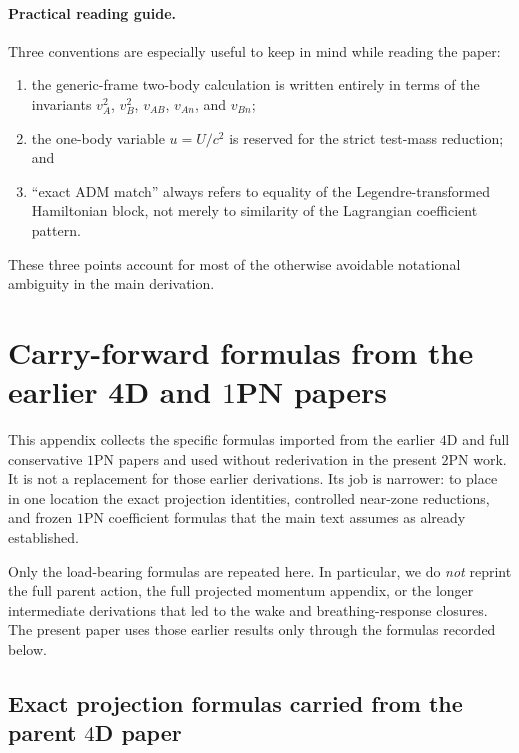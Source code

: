 \documentclass[11pt]{article}
\newcommand{\OnePN}{\mathrm{1PN}}
\newcommand{\TwoPN}{\mathrm{2PN}}
\newcommand{\ADM}{\mathrm{ADM}}
\begin{document}
\paragraph{Practical reading guide.}
Three conventions are especially useful to keep in mind while reading the paper:
\begin{enumerate}[leftmargin=1.5em]
  \item the generic-frame two-body calculation is written entirely in terms of the
  invariants \(v_A^2\), \(v_B^2\), \(v_{AB}\), \(v_{An}\), and \(v_{Bn}\);
  \item the one-body variable \(u=U/c^2\) is reserved for the strict test-mass reduction;
  and
  \item “exact \(\ADM\) match” always refers to equality of the Legendre-transformed
  Hamiltonian block, not merely to similarity of the Lagrangian coefficient pattern.
\end{enumerate}
These three points account for most of the otherwise avoidable notational ambiguity in the
main derivation.

\section{Carry-forward formulas from the earlier 4D and \texorpdfstring{$1$}{1}PN papers}
\label{app:carry-forward-formulas}

This appendix collects the specific formulas imported from the earlier \(4\)D and
full conservative \(\OnePN\) papers and used without rederivation in the present
\(\TwoPN\) work.  It is not a replacement for those earlier derivations.  Its job is
narrower: to place in one location the exact projection identities, controlled
near-zone reductions, and frozen \(\OnePN\) coefficient formulas that the main text
assumes as already established.

Only the load-bearing formulas are repeated here.  In particular, we do \emph{not}
reprint the full parent action, the full projected momentum appendix, or the longer
intermediate derivations that led to the wake and breathing-response closures.  The
present paper uses those earlier results only through the formulas recorded below.

\subsection{Exact projection formulas carried from the parent \texorpdfstring{$4$}{4}D paper}
\label{app:carry-forward-4d-projection}
\end{document}
